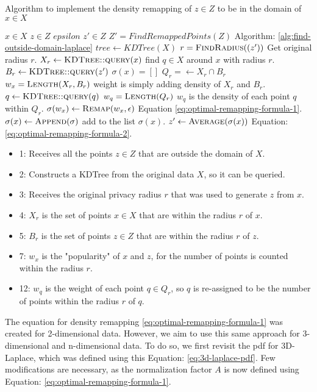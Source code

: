 \begin{algorithm}[H]
  \caption{Algorithm to implement the density remapping of $z \in Z$ to be in the domain of $x \in X$}
  \begin{algorithmic}[1]
    \Require $x \in X$
    \Require $z \in Z$
    \Require $epsilon$
    \Ensure $z' \in Z$
    \State $Z' = FindRemappedPoints(Z)$ \Comment Algorithm: \ref{alg:find-outside-domain-laplace}
    \State $tree \gets KDTree(X)$
    \State $r = \Call{FindRadius}{(z')}$ \Comment Get original radius $r$.
    \State $X_r \gets \Call{KDTree::query}{x}$ \Comment find $q \in X$ around $x$ with radius $r$.
    \State $B_r \gets \Call{KDTree::query}{z'} $
    \State $\sigma(x) = []$
    \State $Q_r = \gets X_r \cap B_r$
    \State $w_x = \Call{Length}{X_r, B_r}$ \Comment weight is simply adding density of $X_r$ and $B_r$.
    \State $q \gets \Call{KDTree::query}{q}$
    \State $w_q = \Call{Length}{Q_r}$ \Comment $w_q$ is the density of each point $q$ within $Q_r$.
    \State $\sigma(w_x) \gets \Call{Remap}{w_x, \epsilon}$ \Comment Equation \ref{eq:optimal-remapping-formula-1}.
    \State $\sigma(x) \gets \Call{Append}{\sigma}$ \Comment add to the list $\sigma(x)$.
    \EndFor
    \State $z' \gets \Call{Average}{\sigma(x)}$ \Comment Equation: \ref{eq:optimal-remapping-formula-2}.
    \EndFor
  \end{algorithmic}
  \label{alg:optimal-remapping-laplace}
\end{algorithm}

\begin{itemize}
  \item 1: Receives all the points $z \in Z$ that are outside the domain of $X$.
  \item 2: Constructs a KDTree from the original data $X$, so it can be queried.
  \item 3: Receives the original privacy radius $r$ that was used to generate $z$ from $x$.
  \item 4: $X_r$ is the set of points $x \in X$ that are within the radius $r$ of $x$.
  \item 5: $B_r$ is the set of points $z \in Z$ that are within the radius $r$ of $z$.
  \item 7: $w_x$ is the "popularity" of $x$ and $z$, for the number of points is counted within the radius $r$.
  \item 12: $w_q$ is the weight of each point $q \in Q_r$, so $q$ is re-assigned to be the number of points within the radius $r$ of $q$.
\end{itemize}

\newpage
The equation for density remapping \ref{eq:optimal-remapping-formula-1} was created for 2-dimensional data.
However, we aim to use this same approach for 3-dimensional and n-dimensional data.
To do so, we first revisit the \gls{pdf} for 3D-Laplace, which was defined using this Equation: \ref{eq:3d-laplace-pdf}.
Few modifications are necessary, as the normalization factor $A$ is now defined using Equation: \ref{eq:optimal-remapping-formula-1}.
